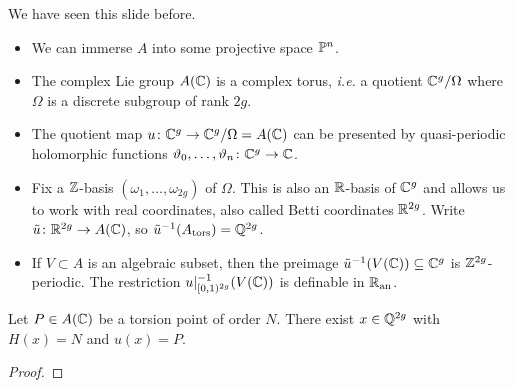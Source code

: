 \documentclass{beamer}
\begin{document}
\begin{frame}{We have seen this slide before.}
  \begin{itemize}
  \item We can immerse $A$ into some projective space ${\mathbb{P}}^n$.

  \item The complex Lie group $A({\mathbb{C}})$ is a complex torus, \textit{i.e.} a
    quotient ${\mathbb{C}}^g/\Omega$ where $\Omega$ is a discrete subgroup of
    rank $2g$.

  \item The quotient map $u\colon {\mathbb{C}}^g\rightarrow {\mathbb{C}}^g/\Omega
    =A({\mathbb{C}})$ can be presented by quasi-periodic holomorphic functions
    $\vartheta_0,\ldots,\vartheta_n \colon {\mathbb{C}}^g\rightarrow{\mathbb{C}}$.

  \item Fix a ${\mathbb{Z}}$-basis $(\omega_1,\ldots,\omega_{2g})$ of $\Omega$.
    This is also an ${\mathbb{R}}$-basis of ${\mathbb{C}}^g$ and allows us to work with
    \alert{real coordinates}, also called \alert{Betti coordinates} ${\mathbb{R}}^{2g}$.
    Write $\tilde u\colon {\mathbb{R}}^{2g}\rightarrow A({\mathbb{C}})$, so
    $\tilde u^{-1}(A_{\mathrm{tors}})={\mathbb{Q}}^{2g}$. 

  \item If $V\subset A$ is an algebraic subset, then the preimage
    $\tilde u^{-1}(V({\mathbb{C}})) \subseteq{\mathbb{C}}^g$ is ${\mathbb{Z}}^{2g}$-periodic.
    The restriction $u|_{[0,1)^{2g}}^{-1}(V({\mathbb{C}}))$ is definable in ${{\mathbb{R}}_{\mathrm{an}}}$.
  \end{itemize}
\end{frame}

\begin{frame}
  \begin{lemma}
    Let $P\in A({\mathbb{C}})$ be a torsion point of order $N$.
    There exist $x\in {\mathbb{Q}}^{2g}$ with $H(x)=N$ and $u(x)=P$. 
  \end{lemma}
  \begin{proof}
    \vspace{2cm}
  \end{proof}
\end{frame}
\end{document}
